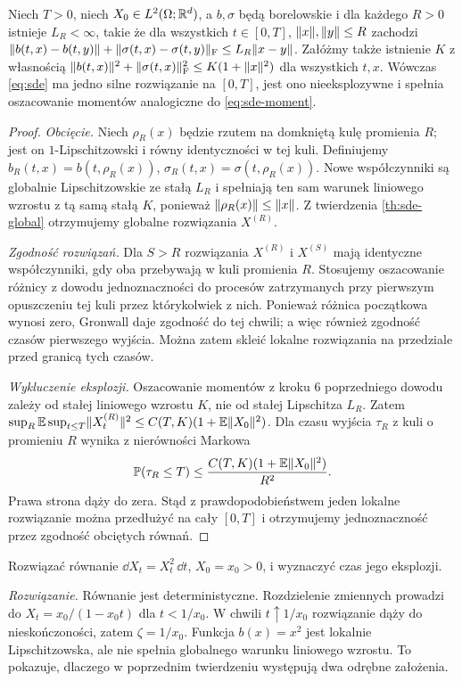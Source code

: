 \begin{twierdzenie}
\label{th:sde-local}
Niech $T>0$, niech $X_0\in L^2(\Omega;\mathbb{R}^d)$,
a $b,\sigma$ będą borelowskie i dla każdego $R>0$
istnieje $L_R<\infty$, takie że dla wszystkich
$t\in[0,T]$, $\lVert x\rVert,\lVert y\rVert\le R$ zachodzi
$\lVert b(t,x)-b(t,y)\rVert+\lVert \sigma(t,x)-\sigma(t,y)\rVert_{\mathrm F}
\le L_R\lVert x-y\rVert$.
Załóżmy także istnienie $K$ z własnością
$\lVert b(t,x)\rVert^2+\lVert \sigma(t,x)\rVert_{\mathrm F}^2
\le K(1+\lVert x\rVert^2)$ dla wszystkich $t,x$.
Wówczas \eqref{eq:sde} ma jedno silne rozwiązanie
na $[0,T]$, jest ono nieeksplozywne i spełnia
oszacowanie momentów analogiczne do \eqref{eq:sde-moment}.
\end{twierdzenie}
\begin{proof}
\emph{Obcięcie.} Niech $\rho_R(x)$ będzie rzutem
na domkniętą kulę promienia $R$; jest on $1$-Lipschitzowski
i równy identyczności w tej kuli. Definiujemy
$b_R(t,x)=b(t,\rho_R(x))$,
$\sigma_R(t,x)=\sigma(t,\rho_R(x))$.
Nowe współczynniki są globalnie Lipschitzowskie
ze stałą $L_R$ i spełniają ten sam warunek liniowego
wzrostu z tą samą stałą $K$, ponieważ
$\lVert \rho_R(x)\rVert\le\lVert x\rVert$.
Z twierdzenia \ref{th:sde-global} otrzymujemy
globalne rozwiązania $X^{(R)}$.

\emph{Zgodność rozwiązań.} Dla $S>R$ rozwiązania
$X^{(R)}$ i $X^{(S)}$ mają identyczne współczynniki,
gdy oba przebywają w kuli promienia $R$.
Stosujemy oszacowanie różnicy z dowodu jednoznaczności
do procesów zatrzymanych przy pierwszym opuszczeniu tej kuli
przez którykolwiek z nich. Ponieważ różnica początkowa
wynosi zero, Gronwall daje zgodność do tej chwili;
a więc również zgodność czasów pierwszego wyjścia.
Można zatem skleić lokalne rozwiązania na przedziale
przed granicą tych czasów.

\emph{Wykluczenie eksplozji.} Oszacowanie momentów z
kroku 6 poprzedniego dowodu zależy od stałej liniowego
wzrostu $K$, nie od stałej Lipschitza $L_R$.
Zatem $\sup_R\mathbb{E}\sup_{t\le T}\lVert X_t^{(R)}\rVert^2
\le C(T,K)(1+\mathbb{E}\lVert X_0\rVert^2)$.
Dla czasu wyjścia $\tau_R$ z kuli o promieniu $R$
wynika z nierówności Markowa
\[
\mathbb{P}(\tau_R\le T)\le
\frac{C(T,K)(1+\mathbb{E}\lVert X_0\rVert^2)}{R^2}.
\]
Prawa strona dąży do zera. Stąd z prawdopodobieństwem
jeden lokalne rozwiązanie można przedłużyć na cały
$[0,T]$ i otrzymujemy jednoznaczność przez zgodność
obciętych równań.
\end{proof}

\begin{zadanie}
Rozwiązać równanie $\dd X_t=X_t^2\,\dd t$,
$X_0=x_0>0$, i wyznaczyć czas jego eksplozji.

\emph{Rozwiązanie.} Równanie jest deterministyczne.
Rozdzielenie zmiennych prowadzi do
$X_t=x_0/(1-x_0t)$ dla $t<1/x_0$.
W chwili $t\uparrow1/x_0$ rozwiązanie dąży do
nieskończoności, zatem $\zeta=1/x_0$. Funkcja
$b(x)=x^2$ jest lokalnie Lipschitzowska, ale nie
spełnia globalnego warunku liniowego wzrostu.
To pokazuje, dlaczego w poprzednim twierdzeniu
występują dwa odrębne założenia.
\end{zadanie}

